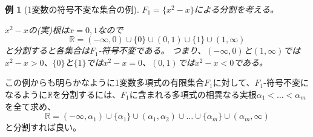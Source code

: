 \documentclass[a4j, 12pt]{jsarticle}
\theoremstyle{break}
\newtheorem{Example}{例}[section]
\begin{document}

\begin{Example}[1変数の符号不変な集合の例]
$ F_1 = \{ x^2 - x \} $による分割を考える。

$x^2 - x$の(実)根は$x = 0, 1$なので
\[\mathbb{R} = (-\infty, 0) \cup \{ 0 \} \cup (0, 1) \cup \{ 1 \} \cup (1, \infty)\]
と分割すると各集合は$F_1$-符号不変である。
つまり、$(-\infty, 0)$と$(1, \infty)$では$x^2 - x > 0$、$\{ 0 \}$と$\{ 1 \}$では$x^2-x = 0$、$(0, 1)$では$x^2 - x < 0$である。
\end{Example}
この例からも明らかなように1変数多項式の有限集合$F_1$に対して、$F_1$-符号不変になるように$\mathbb{R}$を分割するには、$F_1$に含まれる多項式の相異なる実根$\alpha_1 < \dots < \alpha_m$を全て求め、
\[ \mathbb{R} = (-\infty , \alpha_1) \cup \{ \alpha_1 \} \cup (\alpha_1 , \alpha_2) \cup \dots \cup \{ \alpha_m \} \cup (\alpha_m , \infty)\]
と分割すれば良い。
\end{document}
